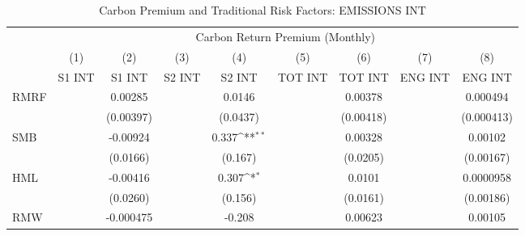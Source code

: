 \begin{table}[htbp]\centering
\def\sym#1{\ifmmode^{#1}\else\(^{#1}\)\fi}
\caption{Carbon Premium and Traditional Risk Factors: EMISSIONS INT}
\begin{tabular}{l*{8}{c}}
\hline\hline
                    &\multicolumn{8}{c}{Carbon Return Premium (Monthly)}                                                                                                                            \\\cmidrule(lr){2-9}
                    &\multicolumn{1}{c}{(1)}&\multicolumn{1}{c}{(2)}&\multicolumn{1}{c}{(3)}&\multicolumn{1}{c}{(4)}&\multicolumn{1}{c}{(5)}&\multicolumn{1}{c}{(6)}&\multicolumn{1}{c}{(7)}&\multicolumn{1}{c}{(8)}\\
                    &\multicolumn{1}{c}{S1 INT}&\multicolumn{1}{c}{S1 INT}&\multicolumn{1}{c}{S2 INT}&\multicolumn{1}{c}{S2 INT}&\multicolumn{1}{c}{TOT INT}&\multicolumn{1}{c}{TOT INT}&\multicolumn{1}{c}{ENG INT}&\multicolumn{1}{c}{ENG INT}\\
\hline
RMRF                &                     &     0.00285         &                     &      0.0146         &                     &     0.00378         &                     &    0.000494         \\
                    &                     &   (0.00397)         &                     &    (0.0437)         &                     &   (0.00418)         &                     &  (0.000413)         \\
SMB                 &                     &    -0.00924         &                     &       0.337\sym{**} &                     &     0.00328         &                     &     0.00102         \\
                    &                     &    (0.0166)         &                     &     (0.167)         &                     &    (0.0205)         &                     &   (0.00167)         \\
HML                 &                     &    -0.00416         &                     &       0.307\sym{*}  &                     &      0.0101         &                     &   0.0000958         \\
                    &                     &    (0.0260)         &                     &     (0.156)         &                     &    (0.0161)         &                     &   (0.00186)         \\
RMW                 &                     &   -0.000475         &                     &      -0.208         &                     &     0.00623         &                     &     0.00105         \\

\end{tabular}
\end{table}
